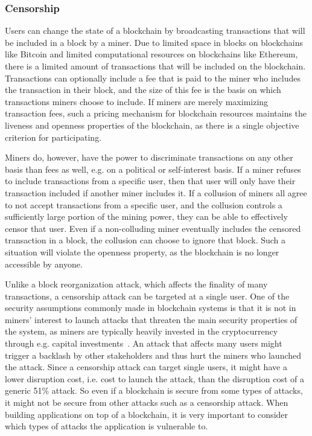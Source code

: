 \subsubsection{Censorship}
Users can change the state of a blockchain by broadcasting transactions that will be included in a block by a miner. Due to limited space in blocks on blockchains like Bitcoin and limited computational resources on blockchains like Ethereum, there is a limited amount of transactions that will be included on the blockchain. Transactions can optionally include a fee that is paid to the miner who includes the transaction in their block, and the size of this fee is the basis on which transactions miners choose to include. If miners are merely maximizing transaction fees, such a pricing mechanism for blockchain resources maintains the liveness and openness properties of the blockchain, as there is a single objective criterion for participating.

Miners do, however, have the power to discriminate transactions on any other basis than fees as well, e.g. on a political or self-interest basis. If a miner refuses to include transactions from a specific user, then that user will only have their transaction included if another miner includes it. If a collusion of miners all agree to not accept transactions from a specific user, and the collusion controls a sufficiently large portion of the mining power, they can be able to effectively censor that user. Even if a non-colluding miner eventually includes the censored transaction in a block, the collusion can choose to ignore that block. Such a situation will violate the openness property, as the blockchain is no longer accessible by anyone. 

Unlike a block reorganization attack, which affects the finality of many transactions, a censorship attack can be targeted at a single user. One of the security assumptions commonly made in blockchain systems is that it is not in miners' interest to launch attacks that threaten the main security properties of the system, as miners are typically heavily invested in the cryptocurrency through e.g. capital investments~\cite{buterin_problem_2015,wuille_security_2019}. An attack that affects many users might trigger a backlash by other stakeholders and thus hurt the miners who launched the attack. Since a censorship attack can target single users, it might have a lower disruption cost, i.e. cost to launch the attack, than the disruption cost of a generic 51\% attack. So even if a blockchain is secure from some types of attacks, it might not be secure from other attacks such as a censorship attack. When building applications on top of a blockchain, it is very important to consider which types of attacks the application is vulnerable to.

